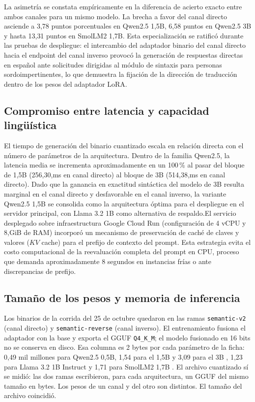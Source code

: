 La asimetría se constata empíricamente en la diferencia de acierto exacto entre ambos canales para un mismo modelo. La brecha a favor del canal directo asciende a 3{,}78 puntos porcentuales en Qwen2.5 1{,}5B, 6{,}58 puntos en Qwen2.5 3B y hasta 13{,}31 puntos en SmolLM2 1{,}7B. Esta especialización se ratificó durante las pruebas de despliegue: el intercambio del adaptador binario del canal directo hacia el endpoint del canal inverso provocó la generación de respuestas directas en español ante solicitudes dirigidas al módulo de sintaxis para personas sordoimpertinentes, lo que demuestra la fijación de la dirección de traducción dentro de los pesos del adaptador LoRA.

\subsection{Compromiso entre latencia y capacidad lingüística}
El tiempo de generación del binario cuantizado escala en relación directa con el número de parámetros de la arquitectura. Dentro de la familia Qwen2.5, la latencia media se incrementa aproximadamente en un 100\,\% al pasar del bloque de 1{,}5B (256{,}30,ms en canal directo) al bloque de 3B (514{,}38,ms en canal directo). Dado que la ganancia en exactitud sintáctica del modelo de 3B resulta marginal en el canal directo y desfavorable en el canal inverso, la variante Qwen2.5 1{,}5B se consolida como la arquitectura óptima para el despliegue en el servidor principal, con Llama 3.2 1B como alternativa de respaldo.El servicio desplegado sobre infraestructura Google Cloud Run (configuración de 4 vCPU y 8,GiB de RAM) incorporó un mecanismo de preservación de caché de claves y valores ($KV$ cache) para el prefijo de contexto del prompt. Esta estrategia evita el costo computacional de la reevaluación completa del prompt en CPU, proceso que demanda aproximadamente 8 segundos en instancias frías o ante discrepancias de prefijo.

\subsection{Tamaño de los pesos y memoria de inferencia}
\label{sec:memoria_inferencia}
Los binarios de la corrida del 25 de octubre quedaron en las ramas \texttt{semantic-v2} (canal directo) y \texttt{semantic-reverse} (canal inverso). El entrenamiento fusiona el adaptador con la base y exporta el GGUF \texttt{Q4\_K\_M}; el modelo fusionado en 16 bits no se conserva en disco. Esa columna es 2 bytes por cada parámetro de la ficha: 0{,}49 mil millones para Qwen2.5 0{,}5B, 1{,}54 para el 1{,}5B y 3{,}09 para el 3B \parencite{qwen2024qwen2505b,qwen2024qwen2515b,qwen2024qwen253b}, 1{,}23 para Llama 3.2 1B Instruct \parencite{meta2024llama321b} y 1{,}71 para SmolLM2 1{,}7B \parencite{allal2024smollm2}. El archivo cuantizado sí se midió: las dos ramas escribieron, para cada arquitectura, un GGUF del mismo tamaño en bytes. Los pesos de un canal y del otro son distintos. El tamaño del archivo coincidió.

